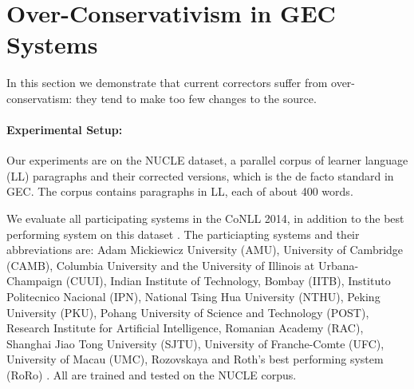 	\section{Over-Conservativism in GEC Systems}\label{sec:formal_conservatism}
	
	
	
	In this section we demonstrate that current correctors
	suffer from over-conservatism: they tend to make too few changes to the source. 
	
	
	\paragraph{Experimental Setup:}\label{par:experimental_setup}
	
	Our experiments are on the NUCLE dataset,
	a parallel corpus of learner language (LL) paragraphs and their corrected versions,
	which is the de facto standard in GEC.
	The corpus contains paragraphs in LL, each of about 400 words.
	
	We evaluate all participating systems in the CoNLL 2014,
	in addition to the best performing system on this dataset \cite{rozovskaya2014building}.
	The particiapting systems and their abbreviations are: Adam Mickiewicz University (AMU),
	University of Cambridge (CAMB), Columbia University and the University of Illinois at Urbana-Champaign (CUUI),
	Indian Institute of Technology, Bombay (IITB), Instituto Politecnico Nacional (IPN),
	National Tsing Hua University (NTHU), Peking University (PKU), Pohang University of Science and Technology (POST),
	Research Institute for Artificial Intelligence, Romanian Academy (RAC), Shanghai Jiao Tong University (SJTU),
	University of Franche-Comte (UFC), University of Macau (UMC),
	Rozovskaya and Roth's best performing system (RoRo) \cite{rozovskaya2016grammatical}.
	All are trained and tested on the NUCLE corpus.
	
